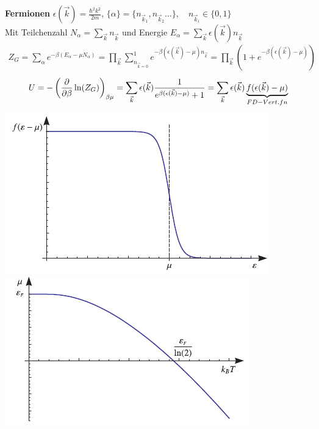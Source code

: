 




{\Huge
\textbf{Fermionen} \(\epsilon(\vec k)=\frac{\hbar^2k^2}{2m}\), \(\{\alpha \}=\{n_{\vec k_1},n_{\vec k_2}\dots \},\quad n_{\vec k_i}\in \{0,1\} \)\\
Mit Teilchenzahl \(N_\alpha = \sum_{\vec k}n_{\vec k}\) und Energie \(E_\alpha= \sum_{\vec k}\epsilon(\vec k) n_{\vec k}\)
\begin{align*}
  Z_G = \sum_{\alpha}e^{-\beta(E_\alpha - \mu N_\alpha)}=\prod_{\vec k} \sum_{n_{\vec k=0}}^{1}e^{-\beta(\epsilon(\vec k) -\mu)n_{\vec k}}=\prod_{\vec k}(1 + e^{-\beta(\epsilon(\vec k)-\mu)})
\end{align*}
\begin{align*}
  U=-\left( \pdiff_\beta \ln(Z_G) \right)_{\beta\mu} = \sum_{\vec k}\epsilon(\vec k) \frac{1}{e^{\beta(\epsilon(\vec k)-\mu)}+1} = \sum_{\vec k}\epsilon(\vec k)\underbr{f(\epsilon(\vec k)-\mu)}_{FD-Vert.fn}
\end{align*}
\includegraphics[scale=0.57]{./verteilung-fermi-dirac.png}
\includegraphics[scale=0.55]{./verteilung-fermi-dirac-chemp.png}


}%

